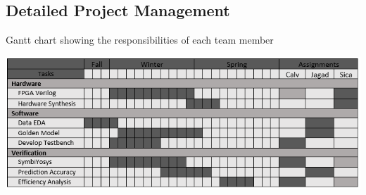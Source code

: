 \documentclass[12pt,titlepage]{article}
\begin{document}



\newpage
\begin{appendices}
\section{Detailed Project Management}
\begin{table}[!htb]
	\caption{Gantt chart showing the responsibilities of each team member}
	\label{tbl:gantt}
	\includegraphics[width=\linewidth]{gantt.png}
\end{table}
\end{appendices}
\end{document}
